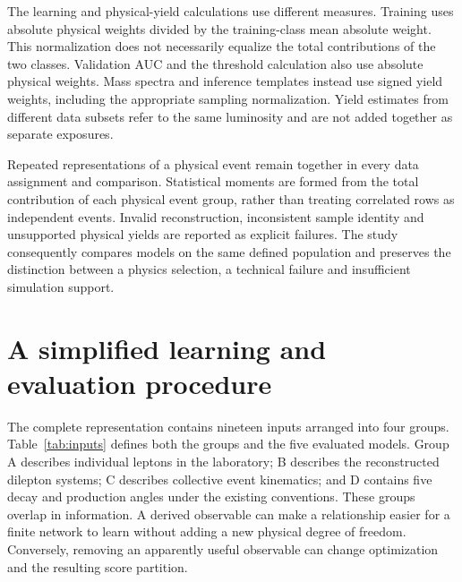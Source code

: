 \documentclass[aps,prd,reprint,superscriptaddress,nofootinbib,longbibliography,floatfix]{revtex4-2}
\begin{document}
The learning and physical-yield calculations use different measures. Training uses absolute
physical weights divided by the training-class mean absolute weight. This normalization does
not necessarily equalize the total contributions of the two classes. Validation AUC and the
threshold calculation also use absolute physical weights. Mass spectra and
inference templates instead use signed yield weights, including the appropriate sampling
normalization. Yield estimates from different data subsets refer to the same luminosity and
are not added together as separate exposures.

Repeated representations of a physical event remain together in every data assignment and
comparison. Statistical moments are formed from the total contribution of each physical
event group, rather than treating correlated rows as independent events. Invalid
reconstruction, inconsistent sample identity and unsupported physical yields are reported as
explicit failures. The study consequently compares models on the same defined population and
preserves the distinction between a physics selection, a technical failure and insufficient
simulation support.

\section{A simplified learning and evaluation procedure}

The complete representation contains nineteen inputs arranged into four groups. Table~\ref{tab:inputs}
defines both the groups and the five evaluated models. Group A describes individual leptons
in the laboratory; B describes the reconstructed dilepton systems; C describes collective
event kinematics; and D contains five decay and production angles under the existing
conventions. These groups overlap in information. A derived observable can make a
relationship easier for a finite network to learn without adding a new physical degree of
freedom. Conversely, removing an apparently useful observable can change optimization and
the resulting score partition.
\end{document}
